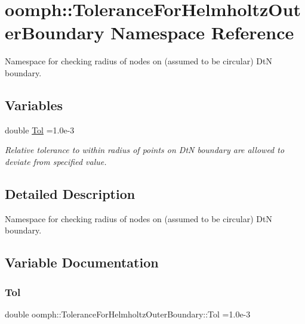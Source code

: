 \hypertarget{namespaceoomph_1_1ToleranceForHelmholtzOuterBoundary}{}\section{oomph\+:\+:Tolerance\+For\+Helmholtz\+Outer\+Boundary Namespace Reference}
\label{namespaceoomph_1_1ToleranceForHelmholtzOuterBoundary}


Namespace for checking radius of nodes on (assumed to be circular) DtN boundary.  


\subsection*{Variables}
\begin{DoxyCompactItemize}
\item 
double \hyperlink{namespaceoomph_1_1ToleranceForHelmholtzOuterBoundary_a8b38c8071a0bd44ff94783e3ebb6c70b}{Tol} =1.\+0e-\/3
\begin{DoxyCompactList}\small\item\em Relative tolerance to within radius of points on DtN boundary are allowed to deviate from specified value. \end{DoxyCompactList}\end{DoxyCompactItemize}


\subsection{Detailed Description}
Namespace for checking radius of nodes on (assumed to be circular) DtN boundary. 

\subsection{Variable Documentation}
\mbox{\label{namespaceoomph_1_1ToleranceForHelmholtzOuterBoundary_a8b38c8071a0bd44ff94783e3ebb6c70b}} 
\subsubsection{\texorpdfstring{Tol}{Tol}}
{\footnotesize\ttfamily double oomph\+::\+Tolerance\+For\+Helmholtz\+Outer\+Boundary\+::\+Tol =1.\+0e-\/3}



